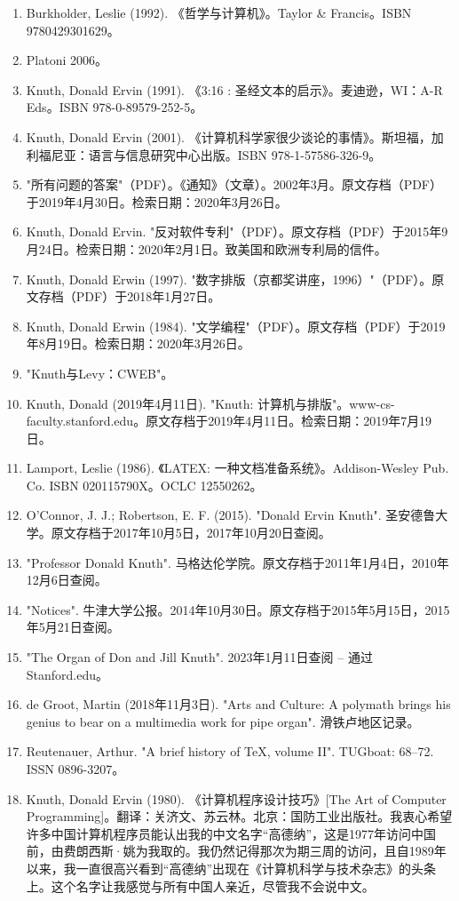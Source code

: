 \begin{enumerate}
\item Burkholder, Leslie (1992). 《哲学与计算机》。Taylor & Francis。ISBN 9780429301629。
\item Platoni 2006。
\item Knuth, Donald Ervin (1991). 《3:16 : 圣经文本的启示》。麦迪逊，WI：A-R Eds。ISBN 978-0-89579-252-5。
\item Knuth, Donald Ervin (2001). 《计算机科学家很少谈论的事情》。斯坦福，加利福尼亚：语言与信息研究中心出版。ISBN 978-1-57586-326-9。
\item "所有问题的答案"（PDF）。《通知》（文章）。2002年3月。原文存档（PDF）于2019年4月30日。检索日期：2020年3月26日。
\item Knuth, Donald Ervin. "反对软件专利"（PDF）。原文存档（PDF）于2015年9月24日。检索日期：2020年2月1日。致美国和欧洲专利局的信件。
\item Knuth, Donald Erwin (1997). "数字排版（京都奖讲座，1996）"（PDF）。原文存档（PDF）于2018年1月27日。
\item Knuth, Donald Erwin (1984). "文学编程"（PDF）。原文存档（PDF）于2019年8月19日。检索日期：2020年3月26日。
\item "Knuth与Levy：CWEB"。
\item Knuth, Donald (2019年4月11日). "Knuth: 计算机与排版"。www-cs-faculty.stanford.edu。原文存档于2019年4月11日。检索日期：2019年7月19日。
\item Lamport, Leslie (1986). 《LATEX: 一种文档准备系统》。Addison-Wesley Pub. Co. ISBN 020115790X。OCLC 12550262。
\item O'Connor, J. J.; Robertson, E. F. (2015). "Donald Ervin Knuth". 圣安德鲁大学。原文存档于2017年10月5日，2017年10月20日查阅。
\item "Professor Donald Knuth". 马格达伦学院。原文存档于2011年1月4日，2010年12月6日查阅。
\item "Notices". 牛津大学公报。2014年10月30日。原文存档于2015年5月15日，2015年5月21日查阅。
\item "The Organ of Don and Jill Knuth". 2023年1月11日查阅 – 通过Stanford.edu。
\item de Groot, Martin (2018年11月3日). "Arts and Culture: A polymath brings his genius to bear on a multimedia work for pipe organ". 滑铁卢地区记录。
\item Reutenauer, Arthur. "A brief history of TeX, volume II". TUGboat: 68–72. ISSN 0896-3207。
\item Knuth, Donald Ervin (1980). 《计算机程序设计技巧》[The Art of Computer Programming]。翻译：关济文、苏云林。北京：国防工业出版社。我衷心希望许多中国计算机程序员能认出我的中文名字“高德纳”，这是1977年访问中国前，由费朗西斯·姚为我取的。我仍然记得那次为期三周的访问，且自1989年以来，我一直很高兴看到“高德纳”出现在《计算机科学与技术杂志》的头条上。这个名字让我感觉与所有中国人亲近，尽管我不会说中文。

\end{enumerate}
